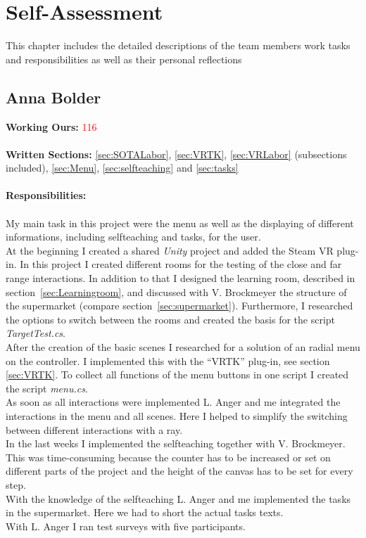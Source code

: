 \section{Self-Assessment} \label{sec:SA}

This chapter includes the detailed descriptions of the team members work tasks and responsibilities as well as their personal reflections


\subsection{Anna Bolder} \label{sec:SAAnna}

\textbf{Working Ours:} \textcolor{red}{116} \\ \\
\textbf{Written Sections:} \ref{sec:SOTALabor}, \ref{sec:VRTK},  \ref{sec:VRLabor} (subsections included), \ref{sec:Menu}, \ref{sec:selfteaching} and \ref{sec:tasks} \\ \\
\textbf{Responsibilities:}\\ \\
My main task in this project were the menu as well as the displaying of different informations, including selfteaching and tasks, for the user. \\
At the beginning I created a shared \textit{Unity} project and added the Steam VR plug-in. In this project I created different rooms for the testing of the close and far range interactions. In addition to that I designed the learning room, described in section~\ref{sec:Learningroom}, and discussed with V. Brockmeyer the structure of the supermarket (compare section~\ref{sec:supermarket}). Furthermore, I researched the options to switch between the rooms and created the basis for the script \textit{TargetTest.cs}.\\
After the creation of the basic scenes I researched for a solution of an radial menu on the controller. I implemented this with the ``VRTK'' plug-in, see section \ref{sec:VRTK}. To collect all functions of the menu buttons in one script I created the script \textit{menu.cs}.\\
As soon as all interactions were implemented L. Anger and me integrated the interactions in the menu and all scenes. Here I helped to simplify the switching between different interactions with a ray. \\
In the last weeks I implemented the selfteaching together with V. Brockmeyer. This was time-consuming because the counter has to be increased or set on different parts of the project and the height of the canvas has to be set for every step.\\
With the knowledge of the selfteaching L. Anger and me implemented the tasks in the supermarket. Here we had to short the actual tasks texts. \\
With L. Anger I ran test surveys with five participants.\\

